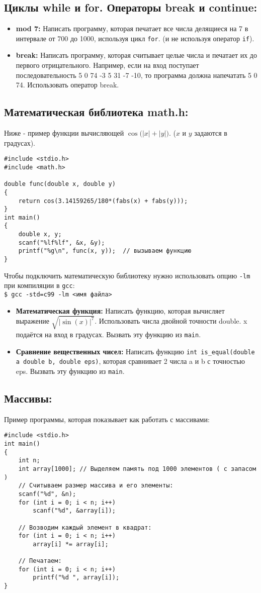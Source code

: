\documentclass{article}
\begin{document}
\subsection*{Циклы while и for. Операторы break и continue:}
\begin{itemize}
\item \textbf{mod 7:} Написать программу, которая печатает все числа делящиеся на 7 в интервале от 700 до 1000, используя цикл \texttt{for}. (и не используя оператор \texttt{if}).
\item \textbf{break:} Написать программу, которая считывает целые числа и печатает их до первого отрицательного. Например, если на вход поступает последовательность 5 0 74 -3 5 31 -7 -10, то программа должна напечатать 5 0 74. Использовать оператор break.
\end{itemize}

\subsection*{Математическая библиотека math.h:}
Ниже - пример функции вычисляющей $\cos \big(|x| + |y|\big)$. ($x$ и $y$ задаются в градусах).
\begin{lstlisting}
#include <stdio.h>
#include <math.h>

double func(double x, double y)
{
	return cos(3.14159265/180*(fabs(x) + fabs(y)));
}
int main()
{
	double x, y;
	scanf("%lf%lf", &x, &y);
	printf("%g\n", func(x, y));  // вызываем функцию
}
\end{lstlisting}
Чтобы подключить математическую библиотеку нужно использовать опцию \texttt{-lm} при компиляции в \texttt{gcc}:\\
\texttt{\$ gcc -std=c99 -lm <имя файла>}
\begin{itemize}
\item \textbf{Математическая функция:} Написать функцию, которая вычисляет выражение $\sqrt{|\sin(x)|^7}$. Использовать числа двойной точности double. x подаётся на вход в градусах. Вызвать эту функцию из \texttt{main}.
\item \textbf{Сравнение вещественных чисел:} Написать функцию \texttt{int is\_equal(double a double b, double eps)}, которая сравнивает 2 числа a и b с точностью eps. Вызвать эту функцию из \texttt{main}.
\end{itemize}
\subsection*{Массивы:}
Пример программы, которая показывает как работать с массивами:
\begin{lstlisting}
#include <stdio.h>
int main()
{
	int n;
	int array[1000]; // Выделяем память под 1000 элементов ( с запасом )
	// Считываем размер массива и его элементы:
	scanf("%d", &n);
	for (int i = 0; i < n; i++)
		scanf("%d", &array[i]);
	
	// Возводим каждый элемент в квадрат:
	for (int i = 0; i < n; i++)
		array[i] *= array[i];
	
	// Печатаем:
	for (int i = 0; i < n; i++)
		printf("%d ", array[i]);
}
\end{lstlisting}
\end{document}
